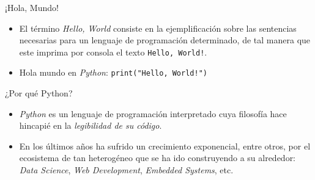 \documentclass{beamer}
\begin{document}
    \begin{frame}{¡Hola, Mundo!}
      \noindent
      \begin{minipage}{.69\textwidth}
        \begin{itemize}
          \item El término \emph{Hello, World} consiste en la ejemplificación sobre las sentencias necesarias para un lenguaje de programación determinado, de tal manera que este imprima por consola el texto \texttt{Hello, World!}.
          \item Hola mundo en \emph{Python}: \texttt{print("Hello, World!")}
        \end{itemize}
      \end{minipage}
      \begin{minipage}{.29\textwidth}
          \begin{center}
            \fontsize{40}{50}
          \end{center}
      \end{minipage}
    \end{frame}

    \begin{frame}{¿Por qué Python?}
        \noindent
        \begin{minipage}{.29\textwidth}
            \begin{center}
              \fontsize{40}{50}
            \end{center}
        \end{minipage}
        \begin{minipage}{.69\textwidth}
          \begin{itemize}
            \item \emph{Python} es un lenguaje de programación interpretado cuya filosofía hace hincapié en la \emph{legibilidad de su código}.
            \item En los últimos años ha sufrido un crecimiento exponencial, entre otros, por el ecosistema de tan heterogéneo que se ha ido construyendo a su alrededor: \emph{Data Science}, \emph{Web Development}, \emph{Embedded Systems}, etc.
          \end{itemize}
        \end{minipage}
    \end{frame}
\end{document}
